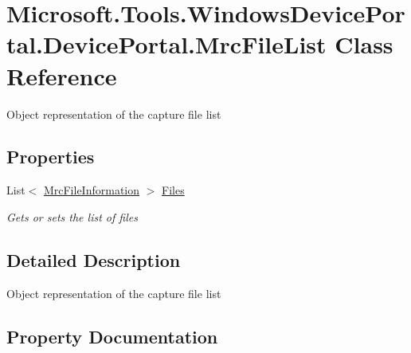 \hypertarget{class_microsoft_1_1_tools_1_1_windows_device_portal_1_1_device_portal_1_1_mrc_file_list}{}\section{Microsoft.\+Tools.\+Windows\+Device\+Portal.\+Device\+Portal.\+Mrc\+File\+List Class Reference}
\label{class_microsoft_1_1_tools_1_1_windows_device_portal_1_1_device_portal_1_1_mrc_file_list}


Object representation of the capture file list  


\subsection*{Properties}
\begin{DoxyCompactItemize}
\item 
List$<$ \hyperlink{class_microsoft_1_1_tools_1_1_windows_device_portal_1_1_device_portal_1_1_mrc_file_information}{Mrc\+File\+Information} $>$ \hyperlink{class_microsoft_1_1_tools_1_1_windows_device_portal_1_1_device_portal_1_1_mrc_file_list_a0f075ad650ee920fd45c40cae6d71804}{Files}
\begin{DoxyCompactList}\small\item\em Gets or sets the list of files \end{DoxyCompactList}\end{DoxyCompactItemize}


\subsection{Detailed Description}
Object representation of the capture file list 



\subsection{Property Documentation}
